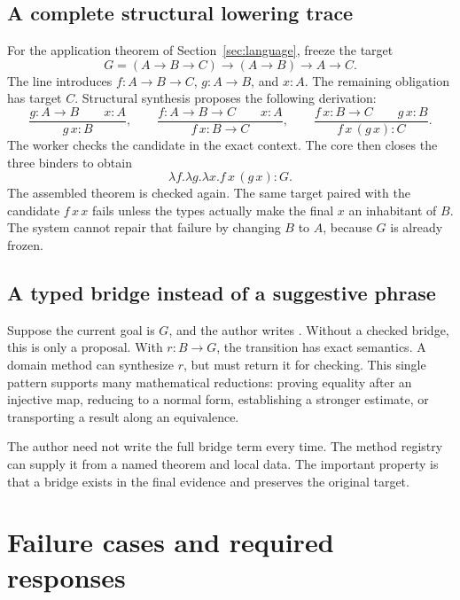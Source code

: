 \documentclass[11pt,a4paper]{article}
\newcommand{\code}[1]{\texttt{\detokenize{#1}}}
\theoremstyle{remark}
\begin{document}
\subsection{A complete structural lowering trace}

For the application theorem of Section~\ref{sec:language}, freeze the target
\[
 G=(A\to B\to C)\to(A\to B)\to A\to C.
\]
The \code{assume} line introduces \(f:A\to B\to C\), \(g:A\to B\), and \(x:A\). The remaining obligation has target \(C\). Structural synthesis proposes the following derivation:
\[
 \frac{g:A\to B\qquad x:A}{g\,x:B},
 \qquad
 \frac{f:A\to B\to C\qquad x:A}{f\,x:B\to C},
 \qquad
 \frac{f\,x:B\to C\qquad g\,x:B}{f\,x\,(g\,x):C}.
\]
The worker checks the candidate in the exact context. The core then closes the three binders to obtain
\[
 \lambda f.\lambda g.\lambda x. f\,x\,(g\,x):G.
\]
The assembled theorem is checked again. The same target paired with the candidate \(f\,x\,x\) fails unless the types actually make the final \(x\) an inhabitant of \(B\). The system cannot repair that failure by changing \(B\) to \(A\), because \(G\) is already frozen.

\subsection{A typed bridge instead of a suggestive phrase}

Suppose the current goal is \(G\), and the author writes \code{suffices B}. Without a checked bridge, this is only a proposal. With \(r:B\to G\), the transition has exact semantics. A domain method can synthesize \(r\), but must return it for checking. This single pattern supports many mathematical reductions: proving equality after an injective map, reducing to a normal form, establishing a stronger estimate, or transporting a result along an equivalence.

The author need not write the full bridge term every time. The method registry can supply it from a named theorem and local data. The important property is that a bridge exists in the final evidence and preserves the original target.

\section{Failure cases and required responses}\label{app:failures}
\end{document}
